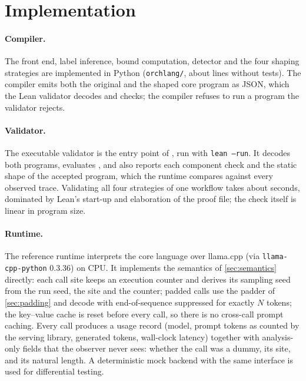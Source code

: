 \section{Implementation}\label{sec:implementation}

\paragraph{Compiler.} The \sys front end, label inference, bound computation, detector and the four shaping strategies are implemented in Python (\texttt{orchlang/}, about \pyLines{} lines without tests). The compiler emits both the original and the shaped core program as JSON, which the Lean validator decodes and checks; the compiler refuses to run a program the validator rejects.

\paragraph{Validator.} The executable validator is the  entry point of , run with \texttt{lean --run}. It decodes both programs, evaluates , and also reports each component check and the static shape of the accepted program, which the runtime compares against every observed trace. Validating all four strategies of one workflow takes about \resLeanSeconds{} seconds, dominated by Lean's start-up and elaboration of the proof file; the check itself is linear in program size.

\paragraph{Runtime.} The reference runtime interprets the core language over llama.cpp (via \texttt{llama-cpp-python} 0.3.36) on CPU. It implements the semantics of \cref{sec:semantics} directly: each call site keeps an execution counter and derives its sampling seed from the run seed, the site and the counter; padded calls use the padder of \cref{sec:padding} and decode with end-of-sequence suppressed for exactly $N$ tokens; the key--value cache is reset before every call, so there is no cross-call prompt caching. Every call produces a usage record (model, prompt tokens as counted by the serving library, generated tokens, wall-clock latency) together with analysis-only fields that the observer never sees: whether the call was a dummy, its site, and its natural length. A deterministic mock backend with the same interface is used for differential testing.


